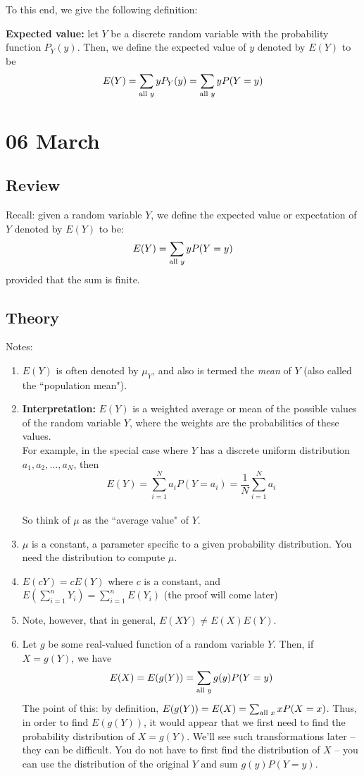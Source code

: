 \documentclass[12pt]{article}
\begin{document}
To this end, we give the following definition:

\textbf{Expected value:} let $Y$ be a discrete random variable with the probability function $P_Y (y)$. Then, we define the expected value of $y$ denoted by $E(Y)$ to be
\[
    E(Y) = \sum_{\textnormal{all } y} y P_Y (y) = \sum_{\textnormal{all } y} y P(Y = y)
\]

\section{06 March}
\subsection{Review}
Recall: given a random variable $Y$, we define the expected value or expectation of $Y$ denoted by $E(Y)$ to be:
\[
    E(Y) = \sum_{\textnormal{all } y} y P(Y = y)
\]
provided that the sum is finite.

\subsection{Theory}
Notes:
\begin{enumerate}
    \item $E(Y)$ is often denoted by $\mu_Y$, and also is termed the \emph{mean} of $Y$ (also called the ``population mean").
    \item \textbf{Interpretation:} $E(Y)$ is a weighted average or mean of the possible values of the random variable $Y$, where the weights are the probabilities of these values. \\
        For example, in the special case where $Y$ has a discrete uniform distribution $a_1, a_2, \ldots, a_N$, then \\
            \[
                E(Y) = \sum_{i = 1}^{N} a_i P(Y = a_i) = \frac{1}{N} \sum_{i = 1}^{N} a_i
            \]
         \\ So think of $\mu$ as the ``average value" of $Y$.
    \item $\mu$ is a constant, a parameter specific to a given probability distribution. You need the distribution to compute $\mu$.
    \item $E(c Y) = c E(Y)$ where $c$ is a constant, and $E (\sum_{i=1}^{n} Y_i) = \sum_{i=1}^{n} E(Y_i)$ (the proof will come later)
    \item Note, however, that in general, $E(XY) \neq E(X)E(Y)$.
    \item Let $g$ be some real-valued function of a random variable $Y$. Then, if $X = g(Y)$, we have
        \[
            E(X) = E(g(Y)) = \sum_{\textnormal{all } y} g(y) P(Y=y)
        \]
        The point of this: by definition, $E(g(Y)) = E(X) = \sum_{\textnormal{all } x} x P(X = x)$. Thus, in order to find $E(g(Y))$, it would appear that we first need to find the probability distribution of $X = g(Y)$. We'll see such transformations later -- they can be difficult. You do not have to first find the distribution of $X$ -- you can use the distribution of the original $Y$ and sum $g(y)P(Y=y)$.
\end{enumerate}
\end{document}
